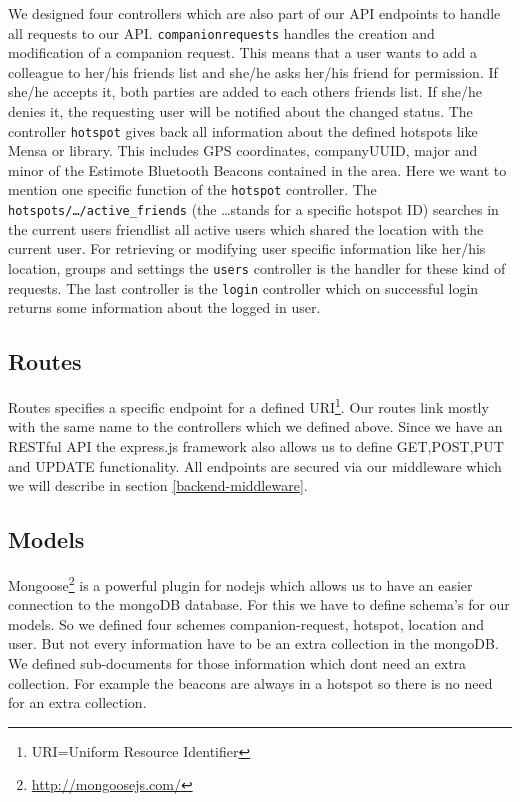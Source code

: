We designed four controllers which are also part of our API endpoints to handle all requests to our API. \texttt{companionrequests} handles the creation and modification of a companion request. This means that a user wants to add a colleague to her/his friends list and she/he asks her/his friend for permission. If she/he accepts it, both parties are added to each others friends list. If she/he denies it, the requesting user will be notified about the changed status. The controller \texttt{hotspot} gives back all information about the defined hotspots like Mensa or library. This includes GPS coordinates, companyUUID, major and minor of the Estimote Bluetooth Beacons contained in the area. Here we want to mention one specific function of the \texttt{hotspot} controller. The \texttt{hotspots/\ldots/active\_friends} (the \ldots stands for a specific hotspot ID) searches in the current users friendlist all active users which shared the location with the current user. For retrieving or modifying user specific information like her/his location, groups and settings the \texttt{users} controller is the handler for these kind of requests. The last controller is the \texttt{login} controller which on successful login returns some information about the logged in user.

\subsection{Routes}

Routes specifies a specific endpoint for a defined URI\footnote{URI=Uniform Resource Identifier}. Our routes link mostly with the same name to the controllers which we defined above. Since we have an RESTful API the express.js framework also allows us to define GET,POST,PUT and UPDATE functionality. All endpoints are secured via our middleware which we will describe in section \ref{backend-middleware}.

\subsection{Models}
\label{mongodb-models}

Mongoose\footnote{\url{http://mongoosejs.com/}} is a powerful plugin for nodejs which allows us to have an easier connection to the mongoDB database. For this we have to define schema's for our models. So we defined four schemes companion-request, hotspot, location and user. But not every information have to be an extra collection in the mongoDB. We defined sub-documents for those information which dont need an extra collection. For example the beacons are always in a hotspot so there is no need for an extra collection.

